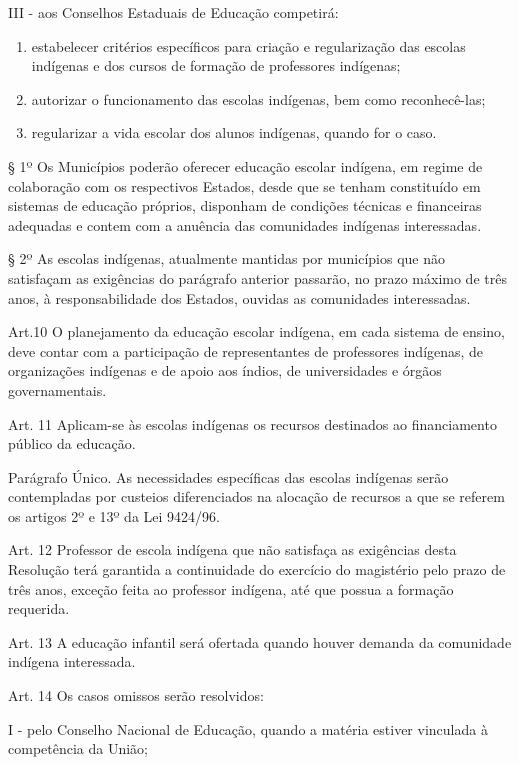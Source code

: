 \documentclass[
]{book}
\begin{document}
III - aos Conselhos Estaduais de Educação competirá:

\begin{enumerate}
\def\labelenumi{\alph{enumi})}
\item
  estabelecer critérios específicos para criação e regularização das escolas indígenas e dos cursos de formação de professores indígenas;
\item
  autorizar o funcionamento das escolas indígenas, bem como reconhecê-las;
\item
  regularizar a vida escolar dos alunos indígenas, quando for o caso.
\end{enumerate}

§ 1º Os Municípios poderão oferecer educação escolar indígena, em regime de colaboração com os respectivos Estados, desde que se tenham constituído em sistemas de educação próprios, disponham de condições técnicas e financeiras adequadas e contem com a anuência das comunidades indígenas interessadas.

§ 2º As escolas indígenas, atualmente mantidas por municípios que não satisfaçam as exigências do parágrafo anterior passarão, no prazo máximo de três anos, à responsabilidade dos Estados, ouvidas as comunidades interessadas.

Art.10 O planejamento da educação escolar indígena, em cada sistema de ensino, deve contar com a participação de representantes de professores indígenas, de organizações indígenas e de apoio aos índios, de universidades e órgãos governamentais.

Art. 11 Aplicam-se às escolas indígenas os recursos destinados ao financiamento público da educação.

Parágrafo Único. As necessidades específicas das escolas indígenas serão contempladas por custeios diferenciados na alocação de recursos a que se referem os artigos 2º e 13º da Lei 9424/96.

Art. 12 Professor de escola indígena que não satisfaça as exigências desta Resolução terá garantida a continuidade do exercício do magistério pelo prazo de três anos, exceção feita ao professor indígena, até que possua a formação requerida.

Art. 13 A educação infantil será ofertada quando houver demanda da comunidade indígena interessada.

Art. 14 Os casos omissos serão resolvidos:

I - pelo Conselho Nacional de Educação, quando a matéria estiver vinculada à competência da União;
\end{document}
